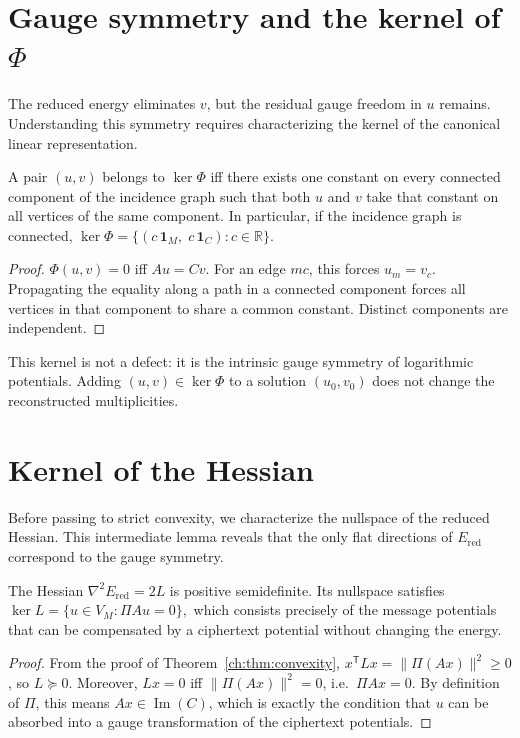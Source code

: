 \section{Gauge symmetry and the kernel of $\Phi$}\label{ch:sec:gauge-symmetry-and-the-kernel-of}
The reduced energy eliminates $v$, but the residual gauge freedom in
$u$ remains.  Understanding this symmetry requires characterizing the
kernel of the canonical linear representation.
\begin{lemma}\label{ch:lem:kernel-Phi}
A pair $(u,v)$ belongs to $\ker\Phi$ iff there exists one constant on every connected component of the incidence graph such that both $u$ and $v$ take that constant on all vertices of the same component.  In particular, if the incidence graph is connected,
$\ker\Phi = \{(c\,\mathbf 1_M,\;c\,\mathbf 1_C) : c\in\mathbb R\}.$
\end{lemma}
\begin{proof}
$\Phi(u,v)=0$ iff $Au=Cv$.  For an edge $mc$, this forces $u_m=v_c$.  Propagating the equality along a path in a connected component forces all vertices in that component to share a common constant.  Distinct components are independent.
\end{proof}

This kernel is not a defect: it is the intrinsic gauge symmetry of logarithmic potentials.  Adding $(u,v)\in\ker\Phi$ to a solution $(u_0,v_0)$ does not change the reconstructed multiplicities.
\section{Kernel of the Hessian}\label{ch:sec:kernel-of-the-hessian}
Before passing to strict convexity, we characterize the nullspace of
the reduced Hessian.  This intermediate lemma reveals that the only
flat directions of $E_{\mathrm{red}}$ correspond to the gauge symmetry.
\begin{lemma}\label{ch:lem:hessian-nullspace}
The Hessian $\nabla^2 E_{\mathrm{red}} = 2L$ is positive semidefinite.
Its nullspace satisfies $\ker L = \{u\in V_M : \Pi A u = 0\},$ which consists precisely of the message potentials that can be compensated by a ciphertext potential without changing the energy.
\end{lemma}
\begin{proof}
From the proof of Theorem~\ref{ch:thm:convexity},
$x^{\mathsf T}Lx = \|\Pi(Ax)\|^2 \ge 0$, so $L\succeq 0$.
Moreover, $Lx=0$ iff $\|\Pi(Ax)\|^2=0$, i.e.\ $\Pi Ax=0$.  By definition
of $\Pi$, this means $Ax\in\operatorname{Im}(C)$, which is exactly the
condition that $u$ can be absorbed into a gauge transformation of the
ciphertext potentials.
\end{proof}

